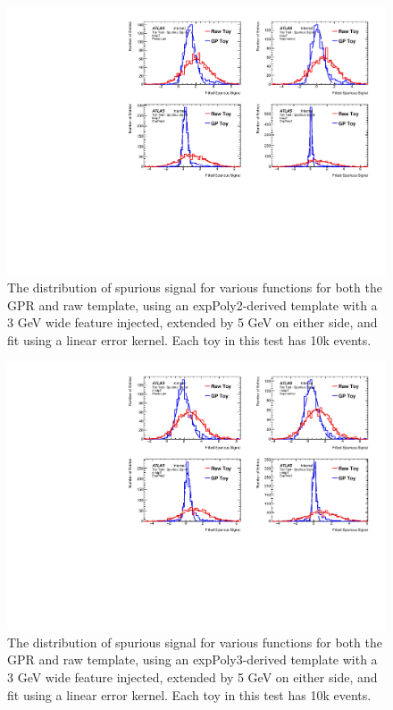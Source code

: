 \begin{figure} 
\begin{center}
  \includegraphics[width=\textwidth]{figures/background/gpr/validation/linear/ToyTest_FitSigVals_lowpT_10k_Sig}   
\caption{The distribution of spurious signal for various functions for both the GPR and raw template, using an expPoly2-derived template with a 3 GeV wide feature injected, extended by 5 GeV on either side, and fit using a linear error kernel. Each toy in this test has 10k events.}
\label{fig:linearkernel_lowpt_10k_Sig}
\end{center}
\end{figure}

\begin{figure} 
\begin{center}
  \includegraphics[width=\textwidth]{figures/background/gpr/validation/linear/ToyTest_FitSigVals_medpT_10k_Sig}   
\caption{The distribution of spurious signal for various functions for both the GPR and raw template, using an expPoly3-derived template with a 3 GeV wide feature injected, extended by 5 GeV on either side, and fit using a linear error kernel. Each toy in this test has 10k events.}
\label{fig:linearkernel_medpt_10k_Sig}
\end{center}
\end{figure}

